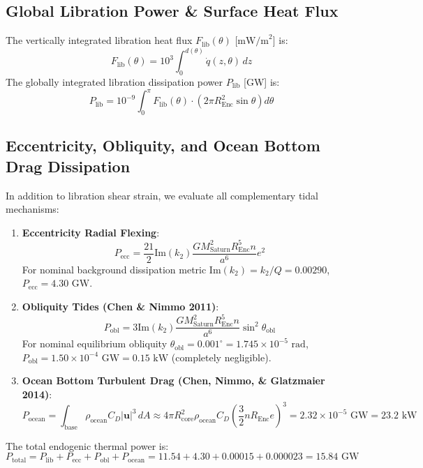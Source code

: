\documentclass[11pt,a4paper]{article}
\begin{document}
\subsection{Global Libration Power \& Surface Heat Flux}
The vertically integrated libration heat flux $F_{\text{lib}}(\theta)$ [$\text{mW/m}^2$] is:
\begin{equation}
F_{\text{lib}}(\theta) = 10^3 \int_0^{d(\theta)} \dot{q}(z, \theta) \, dz
\end{equation}
The globally integrated libration dissipation power $P_{\text{lib}}$ [GW] is:
\begin{equation}
P_{\text{lib}} = 10^{-9} \int_0^\pi F_{\text{lib}}(\theta) \cdot \left( 2\pi R_{\text{Enc}}^2 \sin\theta \right) d\theta
\end{equation}

\subsection{Eccentricity, Obliquity, and Ocean Bottom Drag Dissipation}
In addition to libration shear strain, we evaluate all complementary tidal mechanisms:
\begin{enumerate}
    \item \textbf{Eccentricity Radial Flexing}:
    \begin{equation}
    P_{\text{ecc}} = \frac{21}{2} \text{Im}(k_2) \frac{G M_{\text{Saturn}}^2 R_{\text{Enc}}^5 n}{a^6} e^2
    \end{equation}
    For nominal background dissipation metric $\text{Im}(k_2) = k_2/Q = 0.00290$, $P_{\text{ecc}} = 4.30\text{ GW}$.
    \item \textbf{Obliquity Tides (Chen \& Nimmo 2011)}:
    \begin{equation}
    P_{\text{obl}} = 3 \text{Im}(k_2) \frac{G M_{\text{Saturn}}^2 R_{\text{Enc}}^5 n}{a^6} \sin^2\theta_{\text{obl}}
    \end{equation}
    For nominal equilibrium obliquity $\theta_{\text{obl}} = 0.001^\circ = 1.745 \times 10^{-5}\text{ rad}$, $P_{\text{obl}} = 1.50 \times 10^{-4}\text{ GW} = 0.15\text{ kW}$ (completely negligible).
    \item \textbf{Ocean Bottom Turbulent Drag (Chen, Nimmo, \& Glatzmaier 2014)}:
    \begin{equation}
    P_{\text{ocean}} = \int_{\text{base}} \rho_{\text{ocean}} C_D |\mathbf{u}|^3 \, dA \approx 4\pi R_{\text{core}}^2 \rho_{\text{ocean}} C_D \left( \frac{3}{2} n R_{\text{Enc}} e \right)^3 = 2.32 \times 10^{-5}\text{ GW} = 23.2\text{ kW}
    \end{equation}
\end{enumerate}
The total endogenic thermal power is:
\begin{equation}
P_{\text{total}} = P_{\text{lib}} + P_{\text{ecc}} + P_{\text{obl}} + P_{\text{ocean}} = 11.54 + 4.30 + 0.00015 + 0.000023 = 15.84\text{ GW}
\end{equation}
\end{document}
